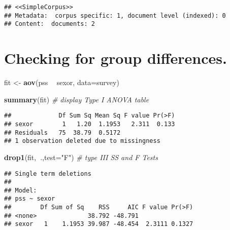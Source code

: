 \documentclass[]{article}
\newenvironment{Shaded}{\begin{snugshade}}{\end{snugshade}}
\newcommand{\KeywordTok}[1]{\textcolor[rgb]{0.13,0.29,0.53}{\textbf{#1}}}
\newcommand{\DataTypeTok}[1]{\textcolor[rgb]{0.13,0.29,0.53}{#1}}
\newcommand{\StringTok}[1]{\textcolor[rgb]{0.31,0.60,0.02}{#1}}
\newcommand{\CommentTok}[1]{\textcolor[rgb]{0.56,0.35,0.01}{\textit{#1}}}
\newcommand{\OperatorTok}[1]{\textcolor[rgb]{0.81,0.36,0.00}{\textbf{#1}}}
\newcommand{\NormalTok}[1]{#1}
\begin{document}
\begin{verbatim}
## <<SimpleCorpus>>
## Metadata:  corpus specific: 1, document level (indexed): 0
## Content:  documents: 2
\end{verbatim}

\begin{Shaded}
\end{Shaded}

\section{Checking for group
differences.}\label{checking-for-group-differences.}

\begin{Shaded}
\begin{Highlighting}[]
\NormalTok{fit <-}\StringTok{ }\KeywordTok{aov}\NormalTok{(pss }\OperatorTok{~}\StringTok{ }\NormalTok{sexor, }\DataTypeTok{data=}\NormalTok{survey)}

\KeywordTok{summary}\NormalTok{(fit) }\CommentTok{# display Type I ANOVA table}
\end{Highlighting}
\end{Shaded}

\begin{verbatim}
##             Df Sum Sq Mean Sq F value Pr(>F)
## sexor        1   1.20  1.1953   2.311  0.133
## Residuals   75  38.79  0.5172               
## 1 observation deleted due to missingness
\end{verbatim}

\begin{Shaded}
\begin{Highlighting}[]
\KeywordTok{drop1}\NormalTok{(fit,}\OperatorTok{~}\NormalTok{.,}\DataTypeTok{test=}\StringTok{"F"}\NormalTok{) }\CommentTok{# type III SS and F Tests}
\end{Highlighting}
\end{Shaded}

\begin{verbatim}
## Single term deletions
## 
## Model:
## pss ~ sexor
##        Df Sum of Sq    RSS     AIC F value Pr(>F)
## <none>              38.792 -48.791               
## sexor   1    1.1953 39.987 -48.454  2.3111 0.1327
\end{verbatim}
\end{document}
